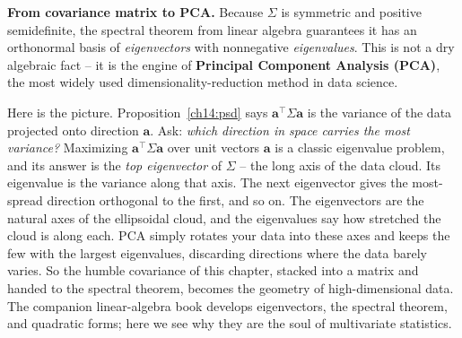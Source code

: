 \begin{connectionbox}
\textbf{From covariance matrix to PCA.} Because $\Sigma$ is symmetric and positive
semidefinite, the spectral theorem from linear algebra guarantees it has an
orthonormal basis of \emph{eigenvectors} with nonnegative \emph{eigenvalues}. This
is not a dry algebraic fact -- it is the engine of \textbf{Principal Component
Analysis (PCA)}, the most widely used dimensionality-reduction method in data
science.

Here is the picture. Proposition~\ref{ch14:psd} says $\mathbf{a}^\top \Sigma
\mathbf{a}$ is the variance of the data projected onto direction $\mathbf{a}$. Ask:
\emph{which direction in space carries the most variance?} Maximizing
$\mathbf{a}^\top \Sigma \mathbf{a}$ over unit vectors $\mathbf{a}$ is a classic
eigenvalue problem, and its answer is the \emph{top eigenvector} of $\Sigma$ -- the
long axis of the data cloud. Its eigenvalue is the variance along that axis. The
next eigenvector gives the most-spread direction orthogonal to the first, and so on.
The eigenvectors are the natural axes of the ellipsoidal cloud, and the eigenvalues
say how stretched the cloud is along each. PCA simply rotates your data into these
axes and keeps the few with the largest eigenvalues, discarding directions where the
data barely varies. So the humble covariance of this chapter, stacked into a matrix
and handed to the spectral theorem, becomes the geometry of high-dimensional data.
The companion linear-algebra book develops eigenvectors, the spectral theorem, and
quadratic forms; here we see why they are the soul of multivariate statistics.
\end{connectionbox}

